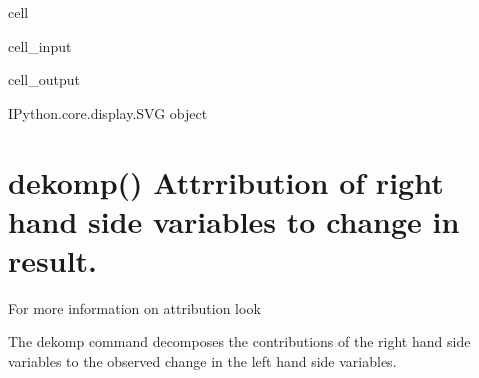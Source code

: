 \documentclass[letterpaper,10pt,english]{jupyterBook}
\begin{document}
\begin{sphinxuseclass}{cell}\begin{sphinxVerbatimInput}

\begin{sphinxuseclass}{cell_input}
\begin{sphinxVerbatim}[commandchars=\\\{\}]
\PYG{p}{[}\PYG{p}{]}  
\end{sphinxVerbatim}

\end{sphinxuseclass}\end{sphinxVerbatimInput}
\begin{sphinxVerbatimOutput}

\begin{sphinxuseclass}{cell_output}
\begin{sphinxVerbatim}[commandchars=\\\{\}]
\PYGZlt{}IPython.core.display.SVG object\PYGZgt{}
\end{sphinxVerbatim}

\end{sphinxuseclass}\end{sphinxVerbatimOutput}

\end{sphinxuseclass}

\section{dekomp() Attrribution of right hand side variables to change in result.}
\label{\detokenize{content/notebooks/modelflow_features:dekomp-attrribution-of-right-hand-side-variables-to-change-in-result}}
\sphinxAtStartPar
For more information on attribution look 

\sphinxAtStartPar
The dekomp command decomposes the contributions of the right hand side variables to the observed change in the left hand side variables.
\end{document}
